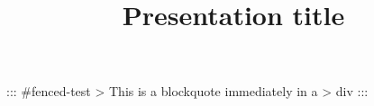 \documentclass{scrartcl}
\title{Presentation title}
\date{}
\begin{document}
\begin{markdown}

::: {#fenced-test}
> This is a blockquote immediately in a
> div
:::

\end{markdown}
\end{document}
